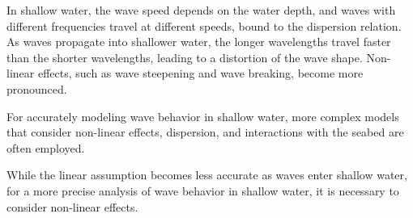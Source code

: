 \documentclass[11pt, a4paper]{article}
\begin{document}
	In shallow water, the wave speed depends on the water depth, and waves with 
	different frequencies travel at different speeds, bound to the dispersion 
	relation. As waves propagate into shallower water, the longer wavelengths 
	travel faster than the shorter wavelengths, leading to a distortion of the 
	wave shape. Non-linear effects, such as wave steepening and wave breaking, 
	become more pronounced.
	
	For accurately modeling wave behavior in shallow water, more complex models 
	that consider non-linear effects, dispersion, and interactions with the 
	seabed are often employed. 
	
	While the linear assumption becomes less accurate as waves enter shallow 
	water, for a more precise analysis of wave behavior in shallow water, it is 
	necessary to consider non-linear effects.
\end{document}
